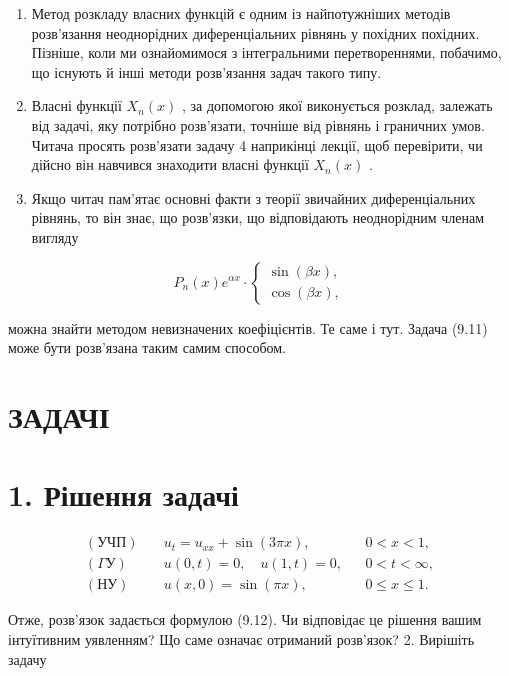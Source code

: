 \documentclass[
  ukrainian,
]{article}
\begin{document}
\begin{enumerate}
\def\labelenumi{\arabic{enumi}.}
\item
  Метод розкладу власних функцій є одним із найпотужніших методів
  розв'язання неоднорідних диференціальних рівнянь у похідних похідних.
  Пізніше, коли ми ознайомимося з інтегральними перетвореннями,
  побачимо, що існують й інші методи розв'язання задач такого типу.
\item
  Власні функції \(X_n(x)\) , за допомогою якої виконується розклад,
  залежать від задачі, яку потрібно розв'язати, точніше від рівнянь і
  граничних умов. Читача просять розв'язати задачу 4 наприкінці лекції,
  щоб перевірити, чи дійсно він навчився знаходити власні функції
  \(X_n(x)\) .
\item
  Якщо читач пам'ятає основні факти з теорії звичайних диференціальних
  рівнянь, то він знає, що розв'язки, що відповідають неоднорідним
  членам вигляду
\end{enumerate}

\[
P_n(x) e^{\alpha x} \cdot
\begin{cases} \sin{(\beta x)}, \\ \cos{(\beta x)}, \end{cases}
\]

можна знайти методом невизначених коефіцієнтів. Те саме і тут. Задача
(9.11) може бути розв'язана таким самим способом.

\section{ЗАДАЧІ}\label{ux437ux430ux434ux430ux447ux456}

\section{1. Рішення
задачі}\label{ux440ux456ux448ux435ux43dux43dux44f-ux437ux430ux434ux430ux447ux456}

\[
\begin{aligned}
(\text{УЧП}) \quad & u_t = u_{xx} + \sin(3\pi x), && 0 < x < 1, \\
(\Gamma \text{У}) \quad & u(0,t) = 0,\quad u(1,t) = 0, && 0 < t < \infty, \\
(\text{НУ}) \quad & u(x,0) = \sin(\pi x), && 0 \leqslant x \leqslant 1.
\end{aligned}
\]

Отже, розв'язок задається формулою (9.12). Чи відповідає це рішення
вашим інтуїтивним уявленням? Що саме означає отриманий розв'язок? 2.
Вирішіть задачу
\end{document}

